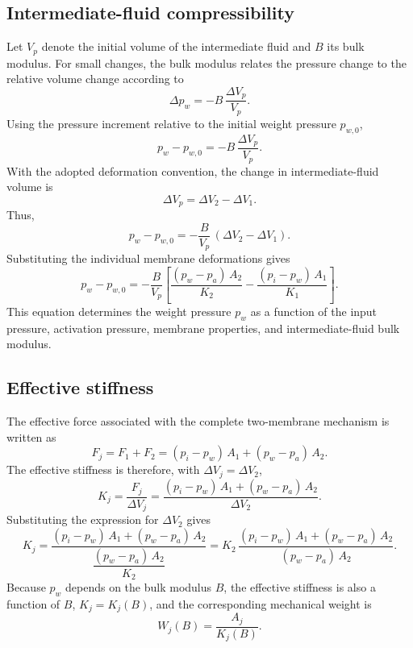 \documentclass[11pt,a4paper]{article}
\numberwithin{equation}{section}
\begin{document}
\begin{appendices}
\subsection{Intermediate-fluid compressibility}

Let $V_p$ denote the initial volume of the intermediate fluid and $B$ its bulk modulus. For small changes, the bulk
modulus relates the pressure change to the relative volume change according to
\begin{equation}
  \Delta p_w = -B\,\frac{\Delta V_p}{V_p} .
\end{equation}
Using the pressure increment relative to the initial weight pressure $p_{w,0}$,
\begin{equation}
  p_w - p_{w,0} = -B\,\frac{\Delta V_p}{V_p} .
\end{equation}
With the adopted deformation convention, the change in intermediate-fluid volume is
\begin{equation}
  \Delta V_p = \Delta V_2 - \Delta V_1 .
\end{equation}
Thus,
\begin{equation}
  p_w - p_{w,0} = -\frac{B}{V_p}\,(\Delta V_2 - \Delta V_1) .
\end{equation}
Substituting the individual membrane deformations gives
\begin{equation}
  p_w - p_{w,0} = -\frac{B}{V_p}\left[\frac{(p_w - p_a)\,A_2}{K_2} - \frac{(p_i - p_w)\,A_1}{K_1}\right] .
  \label{eq:weight-pressure}
\end{equation}
This equation determines the weight pressure $p_w$ as a function of the input pressure, activation pressure,
membrane properties, and intermediate-fluid bulk modulus.

\subsection{Effective stiffness}

The effective force associated with the complete two-membrane mechanism is written as
\begin{equation}
  F_j = F_1 + F_2 = (p_i - p_w)\,A_1 + (p_w - p_a)\,A_2 .
\end{equation}
The effective stiffness is therefore, with $\Delta V_j = \Delta V_2$,
\begin{equation}
  K_j = \frac{F_j}{\Delta V_j} = \frac{(p_i - p_w)\,A_1 + (p_w - p_a)\,A_2}{\Delta V_2} .
\end{equation}
Substituting the expression for $\Delta V_2$ gives
\begin{equation}
  K_j = \frac{(p_i - p_w)\,A_1 + (p_w - p_a)\,A_2}{\dfrac{(p_w - p_a)\,A_2}{K_2}}
      = K_2\,\frac{(p_i - p_w)\,A_1 + (p_w - p_a)\,A_2}{(p_w - p_a)\,A_2} .
\end{equation}
Because $p_w$ depends on the bulk modulus $B$, the effective stiffness is also a function of $B$, $K_j = K_j(B)$, and
the corresponding mechanical weight is
\begin{equation}
  W_j(B) = \frac{A_j}{K_j(B)} .
\end{equation}


\end{appendices}
\end{document}
